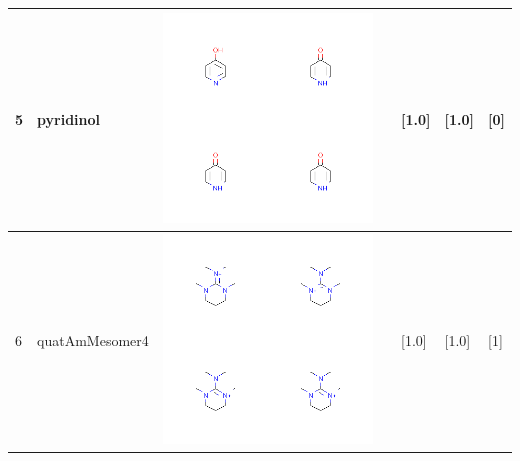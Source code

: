 \begin{longtable}{|l|l|l|l|l|l|l|}
\hline
5 & pyridinol & \includegraphics[scale=0.6]{pyridinolCA.png} & & [1.0]& [1.0] & [0] \\
\hline
6 & quatAmMesomer4 & \includegraphics[scale=0.6]{quatAmMesomer4CA.png} & & [1.0]& [1.0] & [1] \\
\hline

\end{longtable}
